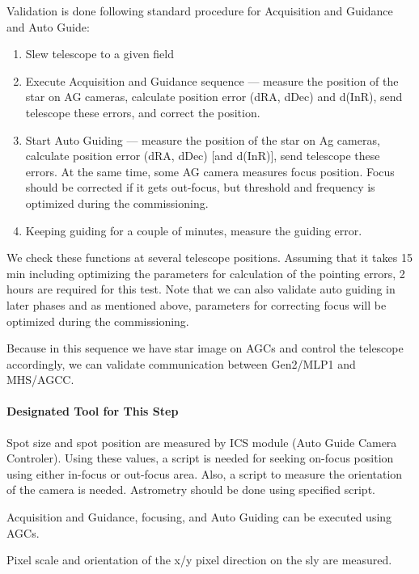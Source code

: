 Validation is done following standard procedure for Acquisition and Guidance and Auto Guide:
\begin{enumerate}
\item Slew telescope to a given field
\item Execute Acquisition and Guidance sequence --- measure the position of the star on AG cameras, calculate position error (dRA, dDec) and d(InR), send telescope these errors, and correct the position.
\item Start Auto Guiding --- measure the position of the star on Ag cameras, calculate position error (dRA, dDec) [and d(InR)], send telescope these errors.
At the same time, some AG camera measures focus position.
Focus should be corrected if it gets out-focus, but threshold and frequency is optimized during the commissioning.
\item Keeping guiding for a couple of minutes, measure the guiding error.
\end{enumerate}


We check these functions at several telescope positions.
Assuming that it takes 15 min including optimizing the parameters for calculation of the pointing errors, 2 hours are required for this test.
Note that we can also validate auto guiding in later phases and as mentioned above, parameters for correcting focus will be optimized during the commissioning.

\smallskip

Because in this sequence we have star image on AGCs  and control the telescope accordingly, we can validate communication between Gen2/MLP1 and MHS/AGCC.

\paragraph{Designated Tool for This Step}
Spot size and spot position are measured by ICS module (Auto Guide Camera Controler).
Using these values, a script is needed for seeking on-focus position using either in-focus or out-focus area.
Also, a script to measure the orientation of the camera is needed.
Astrometry should be done using specified script.

\begin{itembox}[l]{}
Acquisition and Guidance, focusing, and Auto Guiding can be executed using AGCs.

Pixel scale and orientation of the x/y pixel direction on the sly are measured.

\end{itembox}
